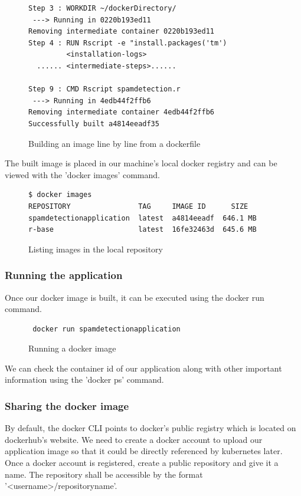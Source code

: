 \documentclass[9pt,twocolumn,twoside]{../../styles/osajnl}
\begin{document}
{\begin{figure}[h]
\begin{verbatim}
Step 3 : WORKDIR ~/dockerDirectory/
 ---> Running in 0220b193ed11
Removing intermediate container 0220b193ed11
Step 4 : RUN Rscript -e "install.packages('tm')
         <installation-logs>
  ...... <intermediate-steps>......

Step 9 : CMD Rscript spamdetection.r
 ---> Running in 4edb44f2ffb6
Removing intermediate container 4edb44f2ffb6
Successfully built a4814eeadf35
\end{verbatim}
\caption{Building an image line by line from a dockerfile}
\label{Building an image from a dockerfile}
\end{figure}

\noindent
The built image is placed in our machine's local docker registry and
can be viewed with the 'docker images' command.

\begin{figure}[H]
\begin{verbatim}
$ docker images
REPOSITORY                TAG     IMAGE ID      SIZE
spamdetectionapplication  latest  a4814eeadf  646.1 MB
r-base                    latest  16fe32463d  645.6 MB
\end{verbatim}                   
\caption{Listing images in the local repository}
\label{Listing images in the local repository}
\end{figure}

\subsubsection{Running the application}

\noindent
Once our docker image is built, it can be executed using the docker
run command.

\begin{figure}[H]
\begin{verbatim}
 docker run spamdetectionapplication
\end{verbatim}
\caption{Running a docker image}
\label{Running a docker image}
\end{figure}

\noindent
We can check the container id of our application along with other
important information using the 'docker ps' command.
 
\subsubsection{Sharing the docker image}

By default, the docker CLI points to docker's public registry which is
located on dockerhub's website. We need to create a docker
account to upload our application image so that it could be directly
referenced by kubernetes later. Once a docker account is registered,
create a public repository and give it a name. The repository shall be
accessible by the format '<username>/repositoryname'.

}
\end{document}
